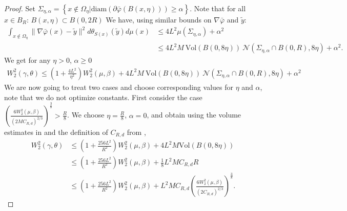 \documentclass[11pt]{article}
\newcommand{\1}{\mathbbm{1}}
\numberwithin{equation}{section}
\begin{document}
\begin{proof}
	Set $\Sigma_{\eta,\alpha} = \left\{ x \not\in \Omega_\eta| \mathrm{diam}(\partial \bar{\varphi}(B(x,\eta))) \geq \alpha \right\}$. Note that for all $x\in B_R$: $B(x,\eta)\subset B(0,2R)$ We have, using similar bounds on $\nabla \bar\varphi$ and $\tilde y$:
	\begin{align}
		\label{eq:tempIneqCoupling}
		\int_{x \not\in\Omega_\eta} \|\nabla \bar\varphi(x) - \tilde{y}\|^2 d\theta_{S(x)} (\tilde{y}) d\mu(x)&\leq 4L^2 \mu(\Sigma_{\eta,\alpha}) + \alpha^2 \nonumber\\
		&\leq 4L^2M \ \mathrm{Vol}(B(0,8\eta)) \ \mathcal{N}(\Sigma_{\eta,\alpha} \cap B(0,R), 8 \eta)  + \alpha^2.
	\end{align}
	We get for any $\eta >0$, $\alpha \geq 0$
	\begin{align}
		\label{eq:mainIneqCoupling}
		W_2^2(\gamma, \theta) \leq\left(1 + \frac{4L^2}{\eta^2}\right)W_2^2(\mu,\beta) + 4L^2M \ \mathrm{Vol}(B(0,8\eta)) \ \mathcal{N}(\Sigma_{\eta,\alpha} \cap B(0,R), 8 \eta) + \alpha^2
	\end{align}
    We are now going to treat two cases and choose corresponding values for $\eta$ and $\alpha$, note that we do not optimize constants.
	First consider the case $\left(\frac{6W_2^2(\mu,\beta)}{(2MC_{R,d})^{2/3}}\right)^{\frac{3}{8}} > \frac{R}{8}$. We choose $\eta = \frac{R}{8}$, $\alpha = 0$, and obtain using the volume estimates in  and the definition of $C_{R,d}$ from ,
	\begin{align*}
		W_2^2(\gamma, \theta) &\leq \left( 1 + \frac{256L^2}{R^2}\right)W_2^2(\mu,\beta) + 4L^2M \mathrm{Vol}(B(0,8\eta)) \\
		&\leq \left( 1 + \frac{256L^2}{R^2}\right)W_2^2(\mu,\beta) + \frac{1}{8} L^2M C_{R,d} R\\
		&\leq \left( 1 + \frac{256L^2}{R^2}\right)W_2^2(\mu,\beta) + L^2M C_{R,d}\left(\frac{6W_2^2(\mu,\beta)}{(2C_{R,d})^{2/3}}\right)^{\frac{3}{8}}.
	\end{align*}


\end{proof}
\end{document}
